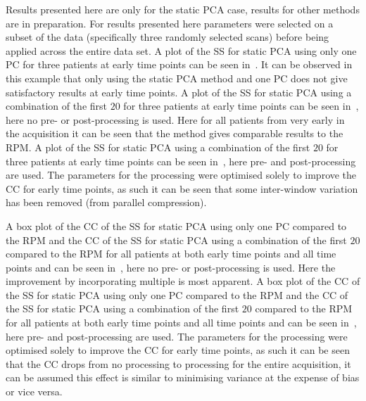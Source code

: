             Results presented here are only for the static \gls{PCA} case, results for other methods are in preparation. For results presented here parameters were selected on a subset of the data (specifically three randomly selected scans) before being applied across the entire data set. A plot of the \gls{SS} for static \gls{PCA} using only one \gls{PC} for three patients at early time points can be seen in~. It can be observed in this example that only using the static \gls{PCA} method and one \gls{PC} does not give satisfactory results at early time points. A plot of the \gls{SS} for static \gls{PCA} using a combination of the first $20$  for three patients at early time points can be seen in~, here no pre- or post-processing is used. Here for all patients from very early in the acquisition it can be seen that the method gives comparable results to the \gls{RPM}. A plot of the \gls{SS} for static \gls{PCA} using a combination of the first $20$  for three patients at early time points can be seen in~, here pre- and post-processing are used. The parameters for the processing were optimised solely to improve the \gls{CC} for early time points, as such it can be seen that some inter-window variation has been removed (from parallel compression).
            
            A box plot of the \gls{CC} of the \gls{SS} for static \gls{PCA} using only one \gls{PC} compared to the \gls{RPM} and the \gls{CC} of the \gls{SS} for static \gls{PCA} using a combination of the first $20$  compared to the \gls{RPM} for all patients at both early time points and all time points and  can be seen in~, here no pre- or post-processing is used. Here the improvement by incorporating multiple  is most apparent. A box plot of the \gls{CC} of the \gls{SS} for static \gls{PCA} using only one \gls{PC} compared to the \gls{RPM} and the \gls{CC} of the \gls{SS} for static \gls{PCA} using a combination of the first $20$  compared to the \gls{RPM} for all patients at both early time points and all time points and  can be seen in~, here pre- and post-processing are used. The parameters for the processing were optimised solely to improve the \gls{CC} for early time points, as such it can be seen that the \gls{CC} drops from no processing to processing for the entire acquisition, it can be assumed this effect is similar to minimising variance at the expense of bias or vice versa.
            
